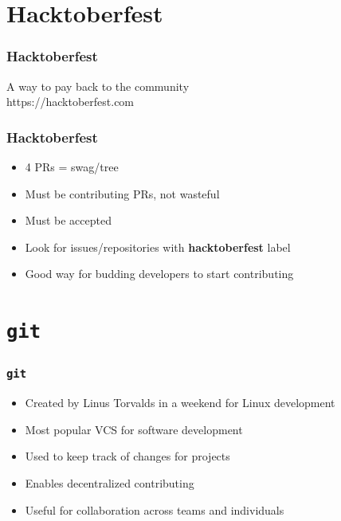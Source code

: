 \documentclass[presentation]{beamer}
\begin{document}
  \section{Hacktoberfest}
  \begin{frame}[standout]
    \frametitle{Hacktoberfest}
  
    A way to pay back to the community \\

    https://hacktoberfest.com
  \end{frame}
  \begin{frame}
    \frametitle{Hacktoberfest}
  
    \begin{itemize}
      \item 4 PRs = swag/tree
      \item Must be contributing PRs, not wasteful
      \item Must be accepted
      \item Look for issues/repositories with \textbf{hacktoberfest} label
      \item Good way for budding developers to start contributing
    \end{itemize}
  \end{frame}

  \section{\texttt{git}}
  \begin{frame}
    \frametitle{\texttt{git}}
 
    \begin{itemize}
      \item Created by Linus Torvalds in a weekend for Linux development
      \item Most popular VCS for software development
      \item Used to keep track of changes for projects
      \item Enables decentralized contributing
      \item Useful for collaboration across teams and individuals
    \end{itemize}
  \end{frame}
\end{document}
